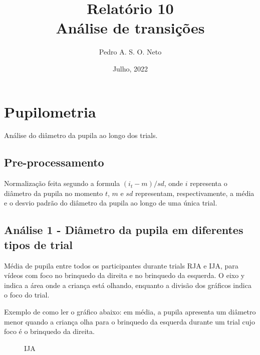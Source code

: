 \documentclass{article}
\title{Relatório 10 \\ Análise de transições}
\author{Pedro A. S. O. Neto}
\date{Julho, 2022}
\begin{document}
\maketitle

\section{Pupilometria}

Análise do diâmetro da pupila ao longo dos trials.

\subsection{Pre-processamento}

Normalização feita segundo a formula $(i_{t}-m)/sd$, onde $i$ representa o diâmetro da pupila no momento $t$, $m$ e $sd$ representam, respectivamente, a média e o desvio padrão do diâmetro da pupila ao longo de uma única trial.

\subsection{Análise 1 - Diâmetro da pupila em diferentes tipos de trial}

Média de pupila entre todos os participantes durante trials RJA e IJA, para vídeos com foco no brinquedo da direita e no brinquedo da esquerda. O eixo y indica a área onde a criança está olhando, enquanto a divisão dos gráficos indica o foco do trial.

Exemplo de como ler o gráfico abaixo: em média, a pupila apresenta um diâmetro menor quando a criança olha para o brinquedo da esquerda durante um trial cujo foco é o brinquedo da direita.

\begin{figure}[t]
\caption{IJA}
\noindent{}
\centering
\end{figure}
\end{document}
